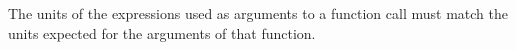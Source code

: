 The units of the expressions used as arguments to a function call must
match the units expected for the arguments of that function.
